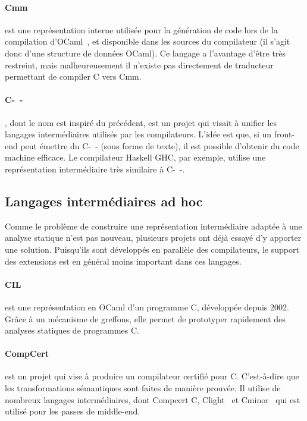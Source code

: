 \paragraph{Cmm} est une représentation interne utilisée pour la génération de
code lors de la compilation d'OCaml~, et disponible dans les sources
du compilateur (il s'agit donc d'une structure de données OCaml). Ce langage a
l'avantage d'être très restreint, mais malheureusement il n'existe pas
directement de traducteur permettant de compiler C vers Cmm.

\paragraph{C-~-}\cite{spjcmm} , dont le nom est inspiré du précédent,
est un projet qui visait à unifier les langages intermédiaires utilisés par les
compilateurs. L'idée est que, si un front-end peut émettre du C-~- (sous forme de
texte), il est possible d'obtenir du code machine efficace. Le compilateur
Haskell GHC, par exemple, utilise une représentation intermédiaire très
similaire à C-~-.


\subsection*{Langages intermédiaires ad hoc}

Comme le problème de construire une représentation intermédiaire adaptée à une
analyse statique n'est pas nouveau, plusieurs projets ont déjà essayé d'y
apporter une solution. Puisqu'ils sont développés en parallèle des compilateurs,
le support des extensions est en général moins important dans ces langages.

\paragraph{CIL}\cite{NeculaCil} est une représentation en OCaml d'un programme
C, développée depuis 2002. Grâce à un mécanisme de greffons, elle permet de
prototyper rapidement des analyses statiques de programmes C.

\paragraph{CompCert} est un projet qui vise à produire un compilateur certifié
pour C. C'est-à-dire que les transformations sémantiques sont faites de manière
prouvée. Il utilise de nombreux langages intermédiaires, dont Compcert C,
Clight~\cite{cfront} et Cminor~\cite{cminorSLfull} qui est utilisé pour les
passes de middle-end.

